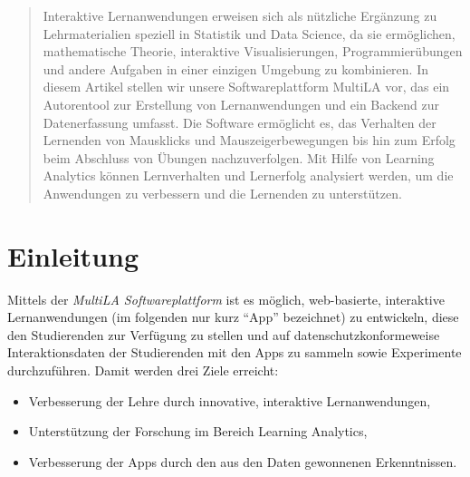 \documentclass[a0,portrait]{a0poster}
\begin{document}
\vspace{1cm} %


\begin{multicols}{2} %


\color{Navy} %

\begin{abstract}

Interaktive Lernanwendungen erweisen sich als nützliche Ergänzung zu Lehrmaterialien speziell in Statistik und Data Science, da sie ermöglichen, mathematische Theorie, interaktive Visualisierungen, Programmierübungen und andere Aufgaben in einer einzigen Umgebung zu kombinieren. In diesem Artikel stellen wir unsere Softwareplattform MultiLA vor, das ein Autorentool zur Erstellung von Lernanwendungen und ein Backend zur Datenerfassung umfasst. Die Software ermöglicht es, das Verhalten der Lernenden von Mausklicks und Mauszeigerbewegungen bis hin zum Erfolg beim Abschluss von Übungen nachzuverfolgen. Mit Hilfe von Learning Analytics können Lernverhalten und Lernerfolg analysiert werden, um die Anwendungen zu verbessern und die Lernenden zu unterstützen.

\end{abstract}


\color{black}

\section*{Einleitung}

Mittels der \textit{MultiLA Softwareplattform} ist es möglich, web-basierte, interaktive Lernanwendungen (im folgenden nur kurz \enquote{App} bezeichnet) zu entwickeln, diese den Studierenden zur Verfügung zu stellen und auf datenschutzkonformeweise Interaktionsdaten der Studierenden mit den Apps zu sammeln sowie Experimente durchzuführen. Damit werden drei Ziele erreicht:

\begin{itemize}
    \item Verbesserung der Lehre durch innovative, interaktive Lernanwendungen,
    \item Unterstützung der Forschung im Bereich Learning Analytics,
    \item Verbesserung der Apps durch den aus den Daten gewonnenen Erkenntnissen.
\end{itemize}


\end{multicols}
\end{document}
